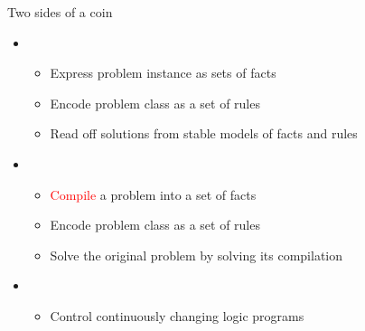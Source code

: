 \begin{frame}{Two sides of a coin}
  \bigskip
  \begin{itemize}
  \item {}
    \begin{itemize}
    \item Express problem instance as sets of facts
    \item Encode  problem class as a set of rules
    \item Read off solutions from stable models of facts and rules
    \end{itemize}
    \bigskip
  \item {}
    \begin{itemize}
    \item \textcolor<3>{red}{Compile} a problem  into a set of facts
    \item<only@4-> Encode  problem class as a set of rules
    \item Solve the original problem by solving its compilation
    \end{itemize}
    \bigskip
  \item<5> 
    \begin{itemize}
    \item<5> Control continuously changing logic programs
    \end{itemize}
  \end{itemize}
\end{frame}